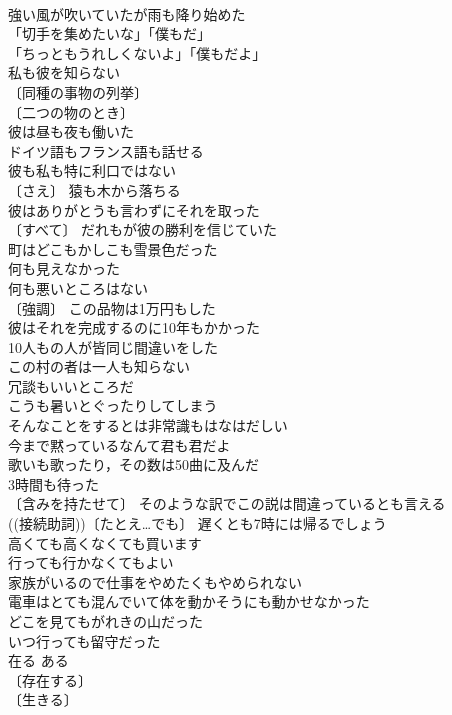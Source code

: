 \documentclass[8pt]{extreport}
\begin{document}
\begin{CJK}{UTF8}{min}
\\	強い風が吹いていたが雨も降り始めた 
\\	「切手を集めたいな」「僕もだ」 
\\	「ちっともうれしくないよ」「僕もだよ」 
\\	私も彼を知らない 
\\	〔同種の事物の列挙〕
\\	〔二つの物のとき〕
\\	彼は昼も夜も働いた 
\\	ドイツ語もフランス語も話せる 
\\	彼も私も特に利口ではない 
\\	〔さえ〕 猿も木から落ちる 
\\	彼はありがとうも言わずにそれを取った 
\\	〔すべて〕 だれもが彼の勝利を信じていた 
\\	町はどこもかしこも雪景色だった 
\\	何も見えなかった 
\\	何も悪いところはない 
\\	〔強調〕 この品物は1万円もした 
\\	彼はそれを完成するのに10年もかかった 
\\	10人もの人が皆同じ間違いをした 
\\	この村の者は一人も知らない 
\\	冗談もいいところだ 
\\	こうも暑いとぐったりしてしまう 
\\	そんなことをするとは非常識もはなはだしい 
\\	今まで黙っているなんて君も君だよ 
\\	歌いも歌ったり，その数は50曲に及んだ 
\\	3時間も待った 
\\	〔含みを持たせて〕 そのような訳でこの説は間違っているとも言える 
\\	((接続助詞))〔たとえ…でも〕 遅くとも7時には帰るでしょう 
\\	高くても高くなくても買います 
\\	行っても行かなくてもよい 
\\	家族がいるので仕事をやめたくもやめられない 
\\	電車はとても混んでいて体を動かそうにも動かせなかった 
\\	どこを見てもがれきの山だった 
\\	いつ行っても留守だった 
\\	在る	ある 
\\	〔存在する〕
\\	〔生きる〕

\end{CJK}
\end{document}
